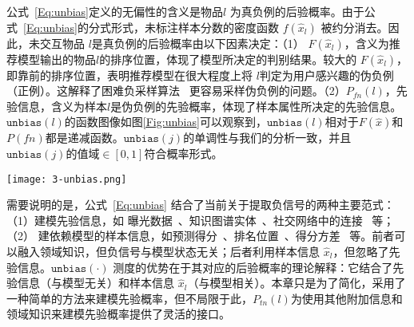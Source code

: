 
公式~\eqref{Eq:unbias}定义的无偏性的含义是物品$l$ 为真负例的后验概率。由于公式~\eqref{Eq:unbias}的分式形式，未标注样本分数的密度函数 $f(\hat{x}_l)$ 被约分消去。因此，未交互物品 $l$是真负例的后验概率由以下因素决定：（1） $F(\hat{x}_l)$，含义为推荐模型输出的物品$l$的排序位置，体现了模型所决定的判别结果。较大的 $F(\hat{x}_l)$，即靠前的排序位置，表明推荐模型在很大程度上将 $l$判定为用户感兴趣的伪负例（正例）。这解释了困难负采样算法~\cite{Steffen:2014:WSDM,Zhang:2013:SIGIR} 更容易采样伪负例的问题。（2）$P_{fn}(l)$，先验信息，含义为样本$l$是伪负例的先验概率，体现了样本属性所决定的先验信息。$\mathtt{unbias}(l)$的函数图像如图\ref{Fig:unbias}可以观察到，$\mathtt{unbias}(l)$相对于$F(\hat{x})$和$P(fn)$都是递减函数。$\mathtt{unbias}(j)$的单调性与我们的分析一致，并且$\mathtt{unbias}(j)$的值域$\in [0,1]$符合概率形式。
\begin{figure*}[!]
	\centering
	\texttt{[image: 3-unbias.png]}
	\caption{后验概率函数图}
	\label{Fig:unbias}
\end{figure*}

需要说明的是，公式~\eqref{Eq:unbias} 结合了当前关于提取负信号的两种主要范式：（1）建模先验信息，如 曝光数据~\cite{Jingtao:2019:IJCAI}、知识图谱实体~\cite{Wang:2020:WWW}、社交网络中的连接~\cite{Zhao:2014:CIKM,Wang:2016:CIKM} 等；（2） 建依赖模型的样本信息，如预测得分~\cite{Steffen:2014:WSDM}、排名位置~\cite{Zhang:2013:SIGIR}、得分方差~\cite{Ding:2020:NIPS} 等。前者可以融入领域知识，但负信号与模型状态无关；后者利用样本信息 $\hat{x}_l$，但忽略了先验信息。$\mathtt{unbias}(\cdot)$ 测度的优势在于其对应的后验概率的理论解释：它结合了先验信息（与模型无关）和样本信息 $\hat{x}_l$（与模型相关）。本章只是为了简化，采用了一种简单的方法来建模先验概率，但不局限于此，$P_{tn}(l)$为使用其他附加信息和领域知识来建模先验概率提供了灵活的接口。

